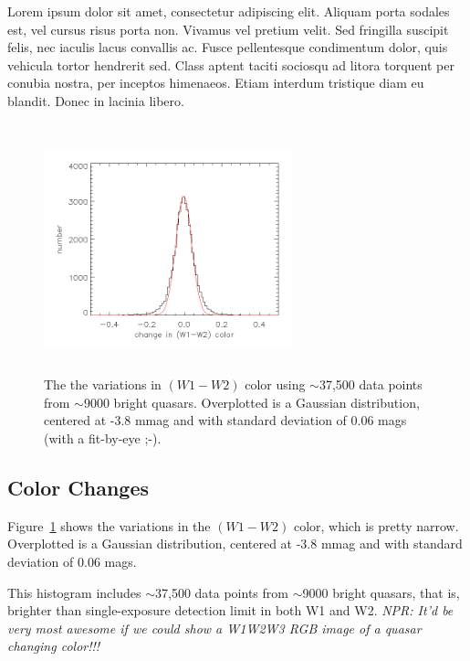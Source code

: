 \documentclass{emulateapj}
\begin{document}
Lorem ipsum dolor sit amet, consectetur adipiscing elit. Aliquam porta
sodales est, vel cursus risus porta non. Vivamus vel pretium
velit. Sed fringilla suscipit felis, nec iaculis lacus convallis
ac. Fusce pellentesque condimentum dolor, quis vehicula tortor
hendrerit sed. Class aptent taciti sociosqu ad litora torquent per
conubia nostra, per inceptos himenaeos. Etiam interdum tristique diam
eu blandit. Donec in lacinia libero.

    \begin{figure}
      \includegraphics[width=7.20cm, height=7.20cm, 
      trim=0.0cm 0.0cm 0.0cm 0.0cm, clip]
      {../plots/w1w2_color_variation.png}
      \centering
      \caption[]{The the variations in $(W1-W2)$ color using
        $\sim$37,500 data points from $\sim$9000 bright quasars.
        Overplotted is a Gaussian distribution, centered at -3.8 mmag 
        and with standard deviation of 0.06 mags (with a fit-by-eye ;-).}
      \label{fig:w1w2_color_variation}
    \end{figure}
    \subsection{Color Changes}
    Figure~\ref{fig:w1w2_color_variation} shows the variations in the
    $(W1-W2)$ color, which is pretty narrow. Overplotted is a Gaussian
    distribution, centered at -3.8 mmag and with standard deviation of
    0.06 mags.
    
    This histogram includes $\sim$37,500 data points from $\sim$9000
    bright quasars, that is, brighter than single-exposure detection limit
    in both W1 and W2. {\it NPR: It'd be very most awesome if we could
      show a W1W2W3 RGB image of a quasar changing color!!!}
    
\end{document}
